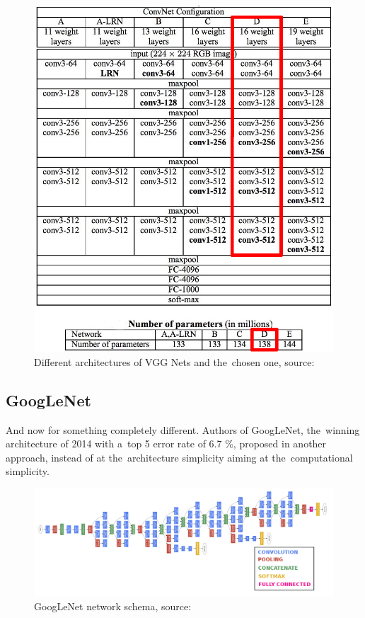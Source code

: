 \begin{figure}[H]
   \centering
	\includegraphics[width=0.8\linewidth]{./pictures/vgg-net.png}
	\caption[VGG Net networks]{Different architectures of VGG Nets and the~chosen 
one, source: \cite{vgg}}
      \label{fig:vgg}
\end{figure}




\subsection{GoogLeNet}
\label{googlenet}

And now for something completely different. Authors of GoogLeNet, the~winning 
architecture of  2014 with a~top 5 error rate of 6.7 \%, proposed in 
\cite{googlenet} another approach, instead of at the~architecture simplicity 
aiming at the~computational simplicity.

\begin{figure}[H]
   \centering
	\includegraphics[width=\linewidth]{./pictures/googlenet.png}
	\caption[GoogLeNet networks]{GoogLeNet network schema, source: 
\cite{googlenet}}
      \label{fig:googlenet}
\end{figure}

